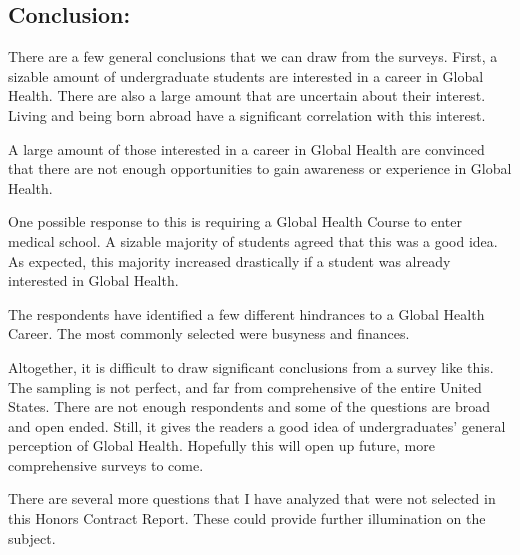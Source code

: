 \documentclass[
  letterpaper,
  DIV=11,
  numbers=noendperiod]{scrartcl}
\begin{document}
\newpage

\hypertarget{conclusion}{%
\subsection{Conclusion:}\label{conclusion}}

There are a few general conclusions that we can draw from the surveys.
First, a sizable amount of undergraduate students are interested in a
career in Global Health. There are also a large amount that are
uncertain about their interest. Living and being born abroad have a
significant correlation with this interest.

A large amount of those interested in a career in Global Health are
convinced that there are not enough opportunities to gain awareness or
experience in Global Health.

One possible response to this is requiring a Global Health Course to
enter medical school. A sizable majority of students agreed that this
was a good idea. As expected, this majority increased drastically if a
student was already interested in Global Health.

The respondents have identified a few different hindrances to a Global
Health Career. The most commonly selected were busyness and finances.

Altogether, it is difficult to draw significant conclusions from a
survey like this. The sampling is not perfect, and far from
comprehensive of the entire United States. There are not enough
respondents and some of the questions are broad and open ended. Still,
it gives the readers a good idea of undergraduates' general perception
of Global Health. Hopefully this will open up future, more comprehensive
surveys to come.

There are several more questions that I have analyzed that were not
selected in this Honors Contract Report. These could provide further
illumination on the subject.
\end{document}
